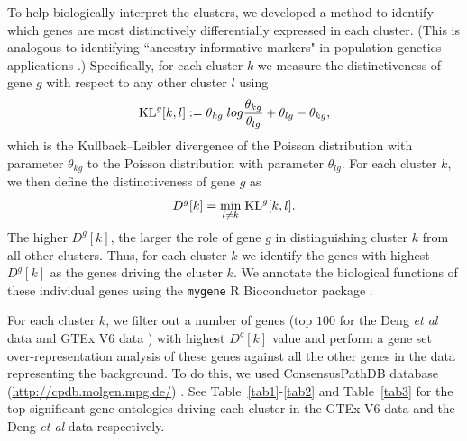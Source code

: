\documentclass[10pt,letterpaper]{article}
\begin{document}
To help biologically interpret the clusters, we developed a method to identify which genes are most distinctively differentially expressed in each cluster.
(This is analogous to identifying ``ancestry informative markers" in population genetics applications \cite{Rosenberg2005}.)
 Specifically, for each cluster $k$ we measure the distinctiveness of gene $g$ with respect to any other cluster $l$ using
\begin{equation}
\text{KL}^{g} [k,l] : = \theta_{kg} \; log \frac{\theta_{kg}}{\theta_{lg}} + \theta_{lg} - \theta_{kg},
\end{equation}
which is the Kullback--Leibler divergence of the Poisson distribution with parameter $\theta_{kg}$ to the Poisson distribution with parameter $\theta_{lg}$.
For each cluster $k$, we then define the distinctiveness of gene $g$ as
\begin{equation}
D^{g}[k] = \underset{l \neq k}{\min} \; \text{KL}^{g} [k, l].
\end{equation}
The higher $D^g[k]$, the larger the role of gene $g$ in distinguishing cluster $k$ from all other clusters.
Thus, for each cluster $k$ we identify the genes with highest $D^{g}[k]$ as the genes driving the cluster $k$.
We annotate the biological functions of these individual genes using the {\tt mygene} R Bioconductor package  \cite{Thompson2014}.


For each cluster $k$, we filter out a number of genes (top $100$ for the Deng \textit{et al} data \cite{Deng2014} and GTEx V6 data \cite{GTEX2013}) with highest $D^{g}[k]$ value and perform a gene set over-representation analysis of these genes against all the other genes in the data representing the background. To do this, we used ConsensusPathDB database (\url{http://cpdb.molgen.mpg.de/})  \cite{Kamburov2013} \cite{Pentchev2010}. See Table~\ref{tab1}-\ref{tab2} and Table~\ref{tab3} for the top significant gene ontologies driving each cluster in the GTEx V6 data and the Deng \textit{et al} data respectively.
\end{document}
